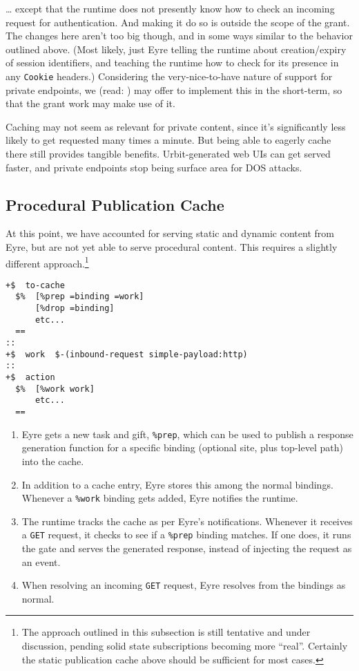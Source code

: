 \documentclass[twoside]{article}
\begin{document}
\ldots{} except that the runtime does not presently know how to check an incoming request for authentication. And making it do so is outside the scope of the grant. The changes here aren't too big though, and in some ways similar to the behavior outlined above. (Most likely, just Eyre telling the runtime about creation/expiry of session identifiers, and teaching the runtime how to check for its presence in any \lstinline[style=inlinecode]{Cookie} headers.) Considering the very-nice-to-have nature of support for private endpoints, we (read: ) may offer to implement this in the short-term, so that the grant work may make use of it.

Caching may not seem as relevant for private content, since it's significantly less likely to get requested many times a minute. But being able to eagerly cache there still provides tangible benefits. Urbit-generated web UIs can get served faster, and private endpoints stop being surface area for DOS attacks.

\subsection{Procedural Publication Cache}

At this point, we have accounted for serving static and dynamic content from Eyre, but are not yet able to serve procedural content. This requires a slightly different approach.\footnote{The approach outlined in this subsection is still tentative and under discussion, pending solid state subscriptions becoming more ``real''. Certainly the static publication cache above should be sufficient for most cases.}

\begin{lstlisting}[style=listingcode]
+$  to-cache
  $%  [%prep =binding =work]
      [%drop =binding]
      etc...
  ==
::
+$  work  $-(inbound-request simple-payload:http)
::
+$  action
  $%  [%work work]
      etc...
  ==
\end{lstlisting}

\begin{enumerate}
  \item  Eyre gets a new task and gift, \lstinline[style=inlinecode]{%prep}, which can be used to publish a response generation function for a specific binding (optional site, plus top-level path) into the cache.
  \item  In addition to a cache entry, Eyre stores this among the normal bindings. Whenever a \lstinline[style=inlinecode]{%work} binding gets added, Eyre notifies the runtime.
  \item  The runtime tracks the cache as per Eyre's notifications. Whenever it receives a \texttt{GET} request, it checks to see if a \lstinline[style=inlinecode]{%prep} binding matches. If one does, it runs the gate and serves the generated response, instead of injecting the request as an event.
  \item  When resolving an incoming \texttt{GET} request, Eyre resolves from the bindings as normal.
\end{enumerate}
\end{document}
